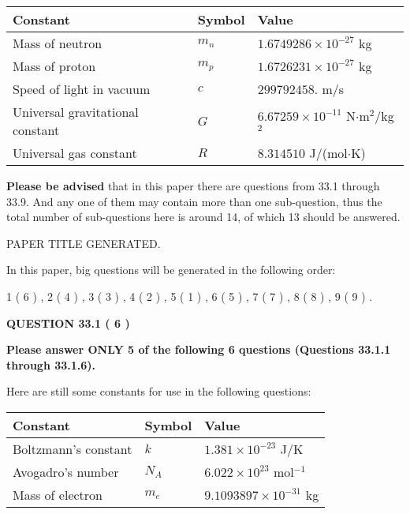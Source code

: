 \documentclass[12pt]{article}
\begin{document}
 
\noindent\begin{tabular}{|l|l|l|}
\hline
Constant & Symbol & Value \\
\hline
Mass of neutron &
$m_n$ &
 $ 1.6749286 \times 10^{-27} $
kg \\
\hline
Mass of proton &
$m_p$ &
 $ 1.6726231 \times 10^{-27} $
kg \\
\hline
Speed of light in vacuum &
$c$ &
 $ 299792458. $
m/s \\
\hline
Universal gravitational constant &
$G$ &
 $ 6.67259 \times 10^{-11} $
N$\cdot $m$^2$/kg$^2$ \\
\hline
Universal gas constant &
$R$ &
 $ 8.314510 $
J/(mol$\cdot $K) \\
\hline
\end{tabular}
 
 
{\textbf{\large{Please be advised}}} that in this paper there are questions from
33.1 through
33.9.
And any one of them may contain more than one sub-question, thus the total number
of sub-questions here is around 14, of which
13 should be answered.
 
\vspace{0.3in}
 
 
   
   
 PAPER TITLE GENERATED.
   
   
   
\vspace{0.2in}
   
In this paper, big questions will be generated in the following order: 
   
   
             1 (           6 )
 ,
             2 (           4 )
 ,
             3 (           3 )
 ,
             4 (           2 )
 ,
             5 (           1 )
 ,
             6 (           5 )
 ,
             7 (           7 )
 ,
             8 (           8 )
 ,
             9 (           9 )
 .
  
\vspace{0.2in}
  
{\textbf{\Large{QUESTION
33.1 
 (           6 )
}}}
  
  
 
{\textbf{\Large{Please answer ONLY
5 of the following
6 questions (Questions
33.1.1 through
33.1.6). }}}
 
Here are still some constants for use in the following questions:
 
 
\noindent\begin{tabular}{|l|l|l|}
\hline
Constant & Symbol & Value \\
\hline
 
Boltzmann's constant &
$k$ &
 $ 1.381 \times 10^{-23} $
J/K \\
\hline
 
Avogadro's number &
$N_A$ &
 $ 6.022 \times 10^{23} $
mol$^{-1}$ \\
\hline
 
Mass of electron &
$m_e$ &
 $ 9.1093897 \times 10^{-31} $
kg \\
\hline
 
\end{tabular}
 
\end{document}
